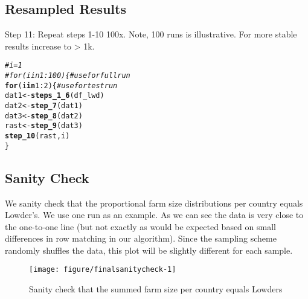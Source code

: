 \documentclass{article}\usepackage[]{graphicx}\usepackage[]{xcolor}
\makeatletter
\newcommand{\hlnum}[1]{\textcolor[rgb]{0.686,0.059,0.569}{#1}}%
\newcommand{\hlcom}[1]{\textcolor[rgb]{0.678,0.584,0.686}{\textit{#1}}}%
\newcommand{\hlopt}[1]{\textcolor[rgb]{0,0,0}{#1}}%
\newcommand{\hlstd}[1]{\textcolor[rgb]{0.345,0.345,0.345}{#1}}%
\newcommand{\hlkwa}[1]{\textcolor[rgb]{0.161,0.373,0.58}{\textbf{#1}}}%
\newcommand{\hlkwb}[1]{\textcolor[rgb]{0.69,0.353,0.396}{#1}}%
\newcommand{\hlkwd}[1]{\textcolor[rgb]{0.737,0.353,0.396}{\textbf{#1}}}%
\newenvironment{kframe}{%
 \def\at@end@of@kframe{}%
 \ifinner\ifhmode%
  \def\at@end@of@kframe{\end{minipage}}%
  \begin{minipage}{\columnwidth}%
 \fi\fi%
 \def\FrameCommand##1{\hskip\@totalleftmargin \hskip-\fboxsep
 \colorbox{shadecolor}{##1}\hskip-\fboxsep
     \hskip-\linewidth \hskip-\@totalleftmargin \hskip\columnwidth}%
 \MakeFramed {\advance\hsize-\width
   \@totalleftmargin\z@ \linewidth\hsize
   \@setminipage}}%
 {\par\unskip\endMakeFramed%
 \at@end@of@kframe}
\newenvironment{knitrout}{}{} %
\makeatother
\begin{document}
\subsection{Resampled Results}


Step 11: Repeat steps 1-10 100x. Note, 100 runs is illustrative. For more stable results increase to > 1k.

\begin{knitrout}
\color{fgcolor}\begin{kframe}
\begin{alltt}
\hlcom{# i = 1}
\hlcom{# for (i in 1:100) \{  # use for full run}
\hlkwa{for} \hlstd{(i} \hlkwa{in} \hlnum{1}\hlopt{:}\hlnum{2}\hlstd{) \{}      \hlcom{# use for test run}
  \hlstd{dat1} \hlkwb{<-} \hlkwd{steps_1_6}\hlstd{(df_lwd)}
  \hlstd{dat2} \hlkwb{<-} \hlkwd{step_7}\hlstd{(dat1)}
  \hlstd{dat3} \hlkwb{<-} \hlkwd{step_8}\hlstd{(dat2)}
  \hlstd{rast} \hlkwb{<-} \hlkwd{step_9}\hlstd{(dat3)}
  \hlkwd{step_10}\hlstd{(rast, i)}
\hlstd{\}}
\end{alltt}
\end{kframe}
\end{knitrout}


\subsection{Sanity Check}

We sanity check that the proportional farm size distributions per country equals Lowder’s. We use one run as an example. As we can see the data is very close to the one-to-one line (but not exactly as would be expected based on small differences in row matching in our algorithm). Since the sampling scheme randomly shuffles the data, this plot will be slightly different for each sample.

\begin{knitrout}\footnotesize
{}\color{fgcolor}\begin{figure}[H]

{\centering \texttt{[image: figure/finalsanitycheck-1]} 

}

\caption[Sanity check that the summed farm size per country equals Lowders]{Sanity check that the summed farm size per country equals Lowders}\label{fig:finalsanitycheck}
\end{figure}

\end{knitrout}
\end{document}
